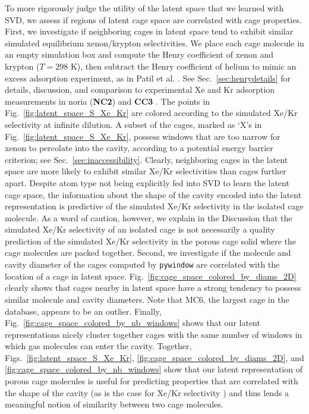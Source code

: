 \documentclass[journal=jacsat,manuscript=article,layout=traditional]{achemso}
\begin{document}
To more rigorously judge the utility of the latent space that we learned with SVD, we assess if regions of latent cage space are correlated with cage properties. First, we investigate if neighboring cages in latent space tend to exhibit similar simulated equilibrium xenon/krypton selectivities.
We place each cage molecule in an empty simulation box and compute the Henry coefficient of xenon and krypton ($T=298$ K), then subtract the Henry coefficient of helium to mimic an excess adsorption experiment, as in Patil et al. \cite{patil2016noria}. See Sec.~\ref{sec:henrydetails} for details, discussion, and comparison to experimental Xe and Kr adsorption measurements in noria (\textbf{NC2}) \cite{patil2016noria} and \textbf{CC3} \cite{chen2014separation}.
The points in Fig.~\ref{fig:latent_space_S_Xe_Kr} are colored according to the simulated Xe/Kr selectivity at infinite dilution. {\color{red} A subset of the cages, marked as `X's in Fig.~\ref{fig:latent_space_S_Xe_Kr}, possess windows that are too narrow for xenon to percolate into the cavity, according to a potential energy barrier criterion; see Sec.~\ref{sec:inaccessibility}.} Clearly, neighboring cages in the latent space are more likely to exhibit similar Xe/Kr selectivities than cages further apart. Despite atom type not being explicitly fed into SVD to learn the latent cage space, the information about the shape of the cavity encoded into the latent representation is predictive of the simulated Xe/Kr selectivity {\color{red} in the isolated cage molecule. As a word of caution, however, we explain in the Discussion that the simulated Xe/Kr selectivity of an isolated cage is not necessarily a quality prediction of the simulated Xe/Kr selectivity in the porous cage solid where the cage molecules are packed together.}
Second, we investigate if the molecule and cavity diameter of the cages computed by \texttt{pywindow} \cite{miklitz2018pywindow} are correlated with the location of a cage in latent space. Fig.~\ref{fig:cage_space_colored_by_diams_2D} clearly shows that cages nearby in latent space have a strong tendency to possess similar molecule and cavity diameters. Note that MC6, the largest cage in the database, appears to be an outlier. 
Finally, Fig.~\ref{fig:cage_space_colored_by_nb_windows} shows that our latent representations nicely cluster together cages with the same number of windows in which gas molecules can enter the cavity.
Together, Figs.~\ref{fig:latent_space_S_Xe_Kr}, \ref{fig:cage_space_colored_by_diams_2D}, and \ref{fig:cage_space_colored_by_nb_windows} show that our latent representation of porous cage molecules is useful for predicting properties that are correlated with the shape of the cavity (as is the case for Xe/Kr selectivity \cite{sikora2012thermodynamic,simon2015best}) and thus lends a meaningful notion of similarity between two cage molecules.
\end{document}
